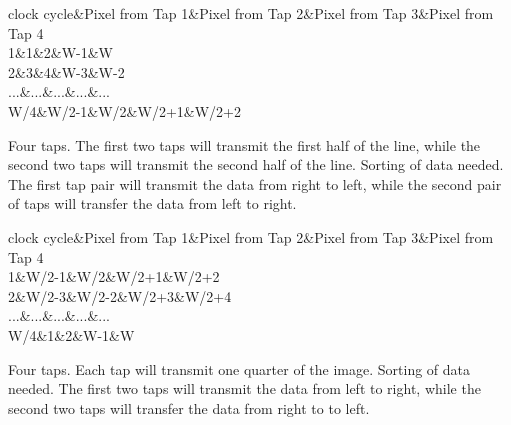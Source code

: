\begin{Desc}
\begin{description}
\begin{TabularC}{5}
\hline
clock cycle&Pixel from Tap 1&Pixel from Tap 2&Pixel from Tap 3&Pixel from Tap 4 \\
1&1&2&W-\/1&W \\
2&3&4&W-\/3&W-\/2 \\
...&...&...&...&... \\
W/4&W/2-\/1&W/2&W/2+1&W/2+2 \\
\end{TabularC}
\item[{\em 
\hypertarget{group___device_specific_interface_gga25ba65893f1ee0e7de99cb51bb858d99af1d14dc76adfc8841d51f26e3f3775a8}{cltxg2\+X2\+M}\label{group___device_specific_interface_gga25ba65893f1ee0e7de99cb51bb858d99af1d14dc76adfc8841d51f26e3f3775a8}
}]Four taps. The first two taps will transmit the first half of the line, while the second two taps will transmit the second half of the line. Sorting of data needed. The first tap pair will transmit the data from right to left, while the second pair of taps will transfer the data from left to right.

\begin{TabularC}{5}
\hline
clock cycle&Pixel from Tap 1&Pixel from Tap 2&Pixel from Tap 3&Pixel from Tap 4 \\
1&W/2-\/1&W/2&W/2+1&W/2+2 \\
2&W/2-\/3&W/2-\/2&W/2+3&W/2+4 \\
...&...&...&...&... \\
W/4&1&2&W-\/1&W \\
\end{TabularC}
\item[{\em 
\hypertarget{group___device_specific_interface_gga25ba65893f1ee0e7de99cb51bb858d99ae132c7d4974b761e457cff9177a56fc4}{cltxg4\+X\+E}\label{group___device_specific_interface_gga25ba65893f1ee0e7de99cb51bb858d99ae132c7d4974b761e457cff9177a56fc4}
}]Four taps. Each tap will transmit one quarter of the image. Sorting of data needed. The first two taps will transmit the data from left to right, while the second two taps will transfer the data from right to to left.


\end{description}
\end{Desc}
